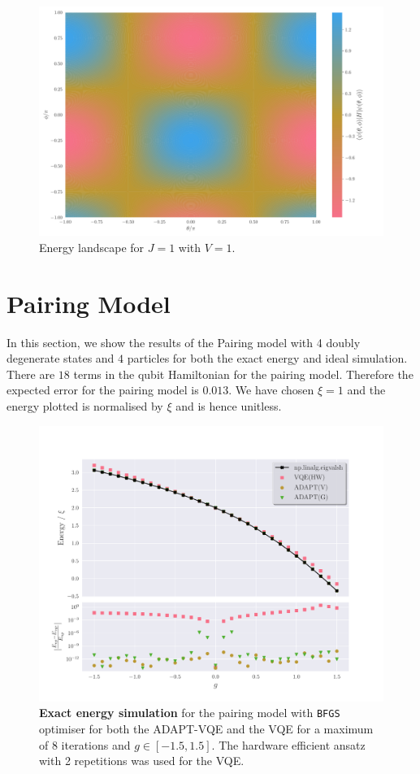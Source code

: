 \begin{figure}[ht]
	\centering
	\includegraphics[width=\linewidth]{image/lipkin_result/energy_landscape.pdf}
	\caption{Energy landscape for $J=1$ with $V=1$. } 
	\label{fig:energy_landscape}
\end{figure}



\section{Pairing Model}
\label{sec:pairing_result}
In this section, we show the results of the Pairing model with 4 doubly degenerate states and $ 4 $ particles for both the exact energy and ideal simulation. There are $ 18 $ terms in the qubit Hamiltonian for the pairing model. Therefore the expected error for the pairing model is $ 0.013 $. We have chosen $ \xi = 1 $ and the energy plotted is normalised by $ \xi $ and is hence unitless.

\begin{figure}[ht]
    \centering
    \includegraphics[width=\linewidth]{image/pairing_result/no_shot_noise/pairing-main-result.pdf}
    \caption{\textbf{Exact energy simulation} for the pairing model with \texttt{BFGS} optimiser for both the ADAPT-VQE and the VQE for a maximum of $ 8 $ iterations and $ g \in[-1.5,1.5] $. The hardware efficient ansatz with 2 repetitions was used for the VQE.}
    \label{fig:small-main}
\end{figure}

